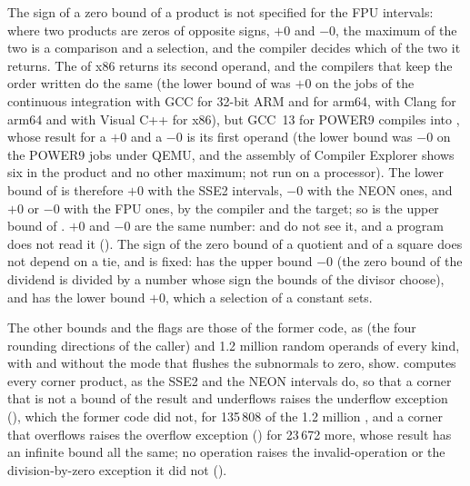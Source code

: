 \documentclass[12pt,a4paper,twoside,openright]{book}
\begin{document}
\begin{Rem}\label{rem:fpu-zero}
The sign of a zero bound of a product is not specified for the FPU
intervals: where two products are zeros of opposite signs, $+0$ and $-0$, the
maximum of the two is a comparison and a selection, and the compiler decides
which of the two it returns. The  of x86 returns its second
operand, and the compilers that keep the order written do the same (the lower
bound of \code{[-1, 0] * [-1, 0]} was $+0$ on the jobs of the continuous
integration with GCC for 32-bit ARM and for arm64, with Clang for arm64 and
with Visual C++ for x86), but GCC~13 for POWER9 compiles
 into , whose result for a $+0$ and a
$-0$ is its first operand (the lower bound was $-0$ on the POWER9 jobs under
QEMU, and the assembly of Compiler Explorer shows six  in the
product and no other maximum; not run on a processor). The lower bound of
\code{[-1, 0] * [-1, 0]} is therefore $+0$ with the SSE2 intervals, $-0$ with
the NEON ones, and $+0$ or $-0$ with the FPU ones, by the compiler and the
target; so is the upper bound of \code{[-1, 0] * [0, 1]}. $+0$ and $-0$ are
the same number: \code{==} and \code{<} do not see it, and a program does not
read it (). The sign of the zero bound of a quotient and
of a square does not depend on a tie, and is fixed: \code{[0, 1] / [-2, -1]}
has the upper bound $-0$ (the zero bound of the dividend is divided by a
number whose sign the bounds of the divisor choose), and
 has the lower bound $+0$, which a selection of a
constant sets.
\end{Rem}

\medskip
The other bounds and the flags are those of the former code, as
 (the four rounding directions of the caller) and 1.2
million random operands of every kind, with and without the mode that flushes
the subnormals to zero, show.  computes every corner product, as
the SSE2 and the NEON intervals do, so that a corner that is not a bound of
the result and underflows raises the underflow exception
(), which the former code did not, for 135\,808 of the
1.2 million , and a corner that overflows raises the overflow
exception () for 23\,672 more, whose result has an
infinite bound all the same; no operation raises the invalid-operation or the
division-by-zero exception it did not ().

\end{document}

